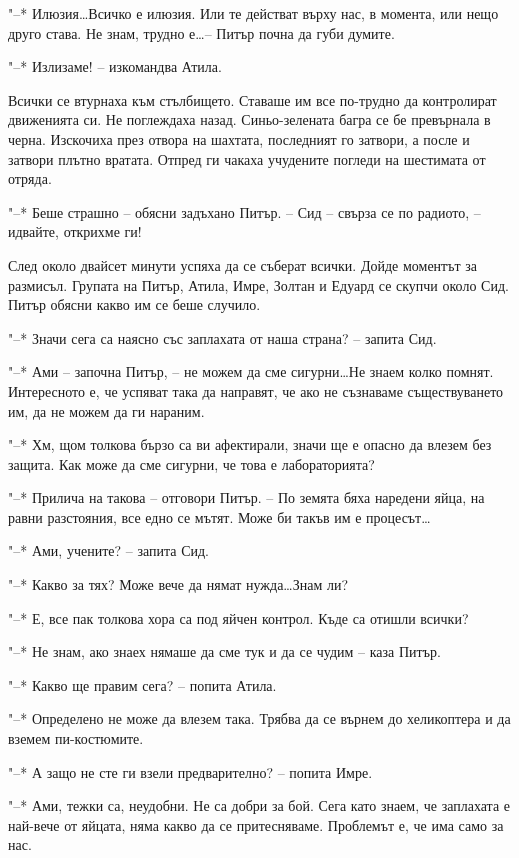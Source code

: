 \documentclass[ebook,openany,12pt]{memoir}
\begin{document}
"--* Илюзия\ldots Всичко е илюзия. Или те действат върху нас, в момента, или нещо друго става. Не знам, труд\-но е\ldots -- Питър почна да губи думите.

"--* Излизаме! – изкомандва Атила.

Всички се втурнаха към стълбището. Ставаше им все по-трудно да контролират движенията си. Не поглеждаха назад. Синьо-зелената багра се бе превърнала в черна. Изскочиха през отвора на шахтата, последният го затвори, а после и затвори плътно вратата. Отпред ги чакаха учудените погледи на шестимата от отряда.

"--* Беше страшно – обясни задъхано Питър. – Сид -- свърза се по радиото, – идвайте, открихме ги!

След около двайсет минути успяха да се съберат всички. Дойде моментът за размисъл. Групата на Питър, Атила, Имре, Золтан и Едуард се скупчи около Сид. Питър обясни какво им се беше случило.

"--* Значи сега са наясно със заплахата от наша страна? – запита Сид.

"--* Ами -- започна Питър, -- не можем да сме сигурни\ldots Не знаем колко помнят. Интересното е, че успяват така да направят, че ако не съзнаваме съществуването им, да не можем да ги нараним. 

"--* Хм, щом толкова бързо са ви афектирали, значи ще е опасно да влезем без защита. Как може да сме сигурни, че това е лабораторията?

"--* Прилича на такова – отговори Питър. – По земята бяха наредени яйца, на равни разстояния, все едно се мътят. Може би такъв им е процесът\ldots

"--* Ами, учените? – запита Сид.

"--* Какво за тях? Може вече да нямат нужда\ldots Знам ли?

"--* Е, все пак толкова хора са под яйчен контрол. Къде са отишли всички?

"--* Не знам, ако знаех нямаше да сме тук и да се чудим – каза Питър.

"--* Какво ще правим сега? – попита Атила.

"--* Определено не може да влезем така. Трябва да се върнем до хеликоптера и да вземем пи-костюмите. 

"--* А защо не сте ги взели предварително? – попита Имре.

"--* Ами, тежки са, неудобни. Не са добри за бой. Сега като знаем, че заплахата е най-вече от яйцата, няма какво да се притесняваме. Проблемът е, че има само за нас.
\end{document}
